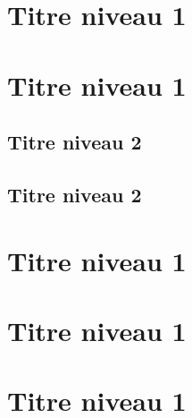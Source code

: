 \newpage


\section{Titre niveau 1} \label{sec:article2-1}

\lipsum[1-4] %

\section{Titre niveau 1} \label{sec:article2-2}

\subsection{Titre niveau 2} \label{subsec:article2-2-1}

\lipsum[1-2] 

\subsection{Titre niveau 2} \label{subsec:article2-2-2}

\lipsum[1-2] 

\section{Titre niveau 1} \label{sec:article2-3}

\lipsum[1-4] %

\section{Titre niveau 1} \label{sec:article2-4}

\lipsum[1-4] %

\section{Titre niveau 1} \label{sec:article2-5}

\lipsum[1-2] %
